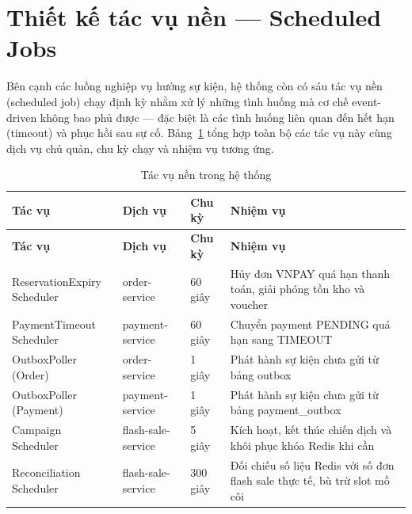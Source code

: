 \documentclass[../DoAn.tex]{subfiles}
\begin{document}
{%

\section{Thiết kế tác vụ nền --- Scheduled Jobs}
\label{section:4.11}

Bên cạnh các luồng nghiệp vụ hướng sự kiện, hệ thống còn có sáu tác vụ nền (scheduled job)
chạy định kỳ nhằm xử lý những tình huống mà cơ chế event-driven không bao phủ được --- đặc
biệt là các tình huống liên quan đến hết hạn (timeout) và phục hồi sau sự cố.
Bảng~\ref{table:scheduled-jobs} tổng hợp toàn bộ các tác vụ này cùng dịch vụ chủ quản, chu kỳ
chạy và nhiệm vụ tương ứng.

{%
\small\setlength{\tabcolsep}{3pt}\renewcommand{\arraystretch}{1.15}%
\begin{longtable}{|p{3.9cm}|p{2.7cm}|p{1.9cm}|p{5.6cm}|}
\caption{Tác vụ nền trong hệ thống}
\label{table:scheduled-jobs} \\
\hline
\textbf{Tác vụ} & \textbf{Dịch vụ} & \textbf{Chu kỳ} & \textbf{Nhiệm vụ} \\ \hline
\endfirsthead
\hline
\textbf{Tác vụ} & \textbf{Dịch vụ} & \textbf{Chu kỳ} & \textbf{Nhiệm vụ} \\ \hline
\endhead
\makecell[l]{ReservationExpiry\\Scheduler} & order-service   & 60 giây  & Hủy đơn VNPAY quá hạn thanh toán, giải phóng tồn kho và voucher \\ \hline
\makecell[l]{PaymentTimeout\\Scheduler}    & payment-service & 60 giây  & Chuyển payment PENDING quá hạn sang TIMEOUT \\ \hline
OutboxPoller (Order)                        & order-service   & 1 giây   & Phát hành sự kiện chưa gửi từ bảng outbox \\ \hline
OutboxPoller (Payment)                      & payment-service & 1 giây   & Phát hành sự kiện chưa gửi từ bảng payment\_outbox \\ \hline
\makecell[l]{Campaign\\Scheduler}          & flash-sale-service & 5 giây & Kích hoạt, kết thúc chiến dịch và khôi phục khóa Redis khi cần \\ \hline
\makecell[l]{Reconciliation\\Scheduler}    & flash-sale-service & 300 giây & Đối chiếu số liệu Redis với số đơn flash sale thực tế, bù trừ slot mồ côi \\ \hline
\end{longtable}
}

}
\end{document}
